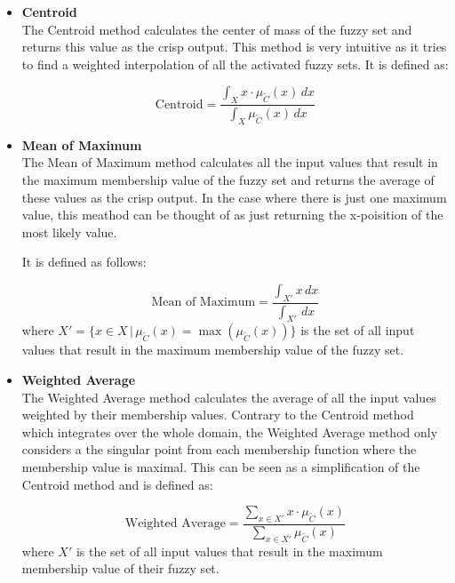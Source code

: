 \begin{itemize}
      \item \textbf{Centroid} \\
            The Centroid method calculates the center of mass of the fuzzy set and returns this value as the crisp output. This method is very intuitive as it tries to find a weighted interpolation of all the activated fuzzy sets. It is defined as:

            \begin{equation}
                  \text{Centroid} = \frac{\int_X x \cdot \mu_{\tilde{C}}(x) \, dx}{\int_X \mu_{\tilde{C}}(x) \, dx}
            \end{equation}

      \item \textbf{Mean of Maximum} \\
            The Mean of Maximum method calculates all the input values that result in the maximum membership value of the fuzzy set and returns the average of these values as the crisp output. In the case where there is just one maximum value, this meathod can be thought of as just returning the x-poisition of the most likely value.

            It is defined as follows:

            \begin{equation}
                  \text{Mean of Maximum} = \frac{\int_{X'} x \, dx}{\int_{X'}  \, dx}
            \end{equation}
            where $X' = \{x \in X \, | \, \mu_{\tilde{C}}(x) = \max(\mu_{\tilde{C}}(x))\}$ is the set of all input values that result in the maximum membership value of the fuzzy set.



      \item \textbf{Weighted Average} \\
            The Weighted Average method calculates the average of all the input values weighted by their membership values. Contrary to the Centroid method which integrates over the whole domain, the Weighted Average method only considers a the singular point from each membership function where the membership value is maximal. This can be seen as a simplification of the Centroid method and is defined as:

            \begin{equation}
                  \text{Weighted Average} = \frac{\sum_{x \in X'} x \cdot \mu_{\tilde{C}}(x)}{\sum_{x \in X'} \mu_{\tilde{C}}(x)}
            \end{equation}
            where $X'$ is the set of all input values that result in the maximum membership value of their fuzzy set.
\end{itemize}

